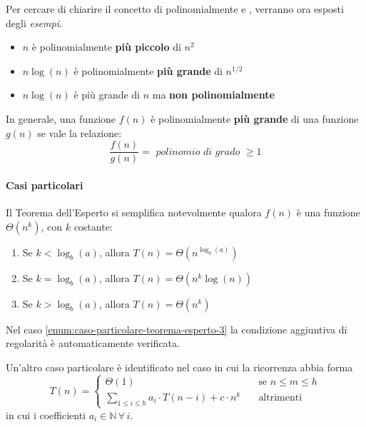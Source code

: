 \documentclass[italian, 10pt]{article}
\begin{document}
Per cercare di chiarire il concetto di polinomialmente  e , verranno ora esposti degli \textit{esempi}.

\begin{itemize}
  \item \(n\) è polinomialmente \textbf{più piccolo} di \(n^2\)
  \item \(n \log (n)\) è polinomialmente \textbf{più grande} di \(n^{1/2}\)
  \item \(n \log (n)\) è più grande di \(n\) ma \textbf{non polinomialmente}
\end{itemize}

\bigskip
In generale, una funzione \(f(n)\) è polinomialmente \textbf{più grande} di una funzione \(g(n)\) se vale la relazione:
\[\dfrac{f(n)}{g(n)} = \textit{ polinomio di grado } \geq 1 \]

\paragraph{Casi particolari}

Il Teorema dell'Esperto si semplifica notevolmente qualora \(f(n)\) è una funzione \(\Theta(n^k)\), con \(k\) costante:

\begin{enumerate}[label=\arabic*), ref=(\arabic*)]
  \item\label{enum:caso-particolare-teorema-esperto-1} Se \(k < \log_b(a)\), allora \(T(n) = \Theta\left(n^{\log_b(a)}\right)\)
  \item\label{enum:caso-particolare-teorema-esperto-2} Se \(k = \log_b(a)\), allora \(T(n) = \Theta\left(n^k \log{(n)}\right)\)
  \item\label{enum:caso-particolare-teorema-esperto-3} Se \(k > \log_b(a)\), allora \(T(n) = \Theta\left(n^k\right)\)
\end{enumerate}

Nel caso \ref{enum:caso-particolare-teorema-esperto-3} la condizione aggiuntiva di regolarità è automaticamente verificata.

\bigskip
Un'altro caso particolare è identificato nel caso in cui la ricorrenza abbia forma
\[T(n) = \begin{cases}
    \Theta(1) \quad                                                           & \text{se } n \leq m \leq h \\
    \displaystyle \sum_{1 \leq i \leq h} a_i \cdot T(n-i) + c \cdot n^k \quad & \text{altrimenti}
  \end{cases}\]
in cui i coefficienti \(a_i \in \mathbb{N} \, \forall \, i\).
\end{document}
